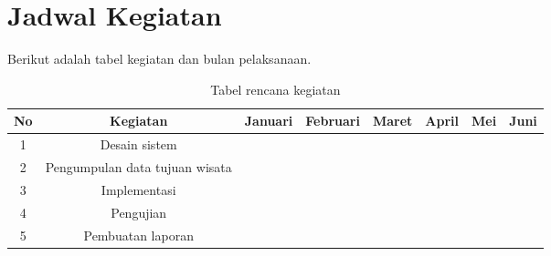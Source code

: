 \section{Jadwal Kegiatan}
Berikut adalah tabel kegiatan dan bulan pelaksanaan.
 
\begin{table}[h!]

\begin{tabular}{||c c c c c c c c||} 
 \hline
 No & Kegiatan & Januari & Februari & Maret & April & Mei & Juni \\ [1ex] 
 \hline\hline
 1 & Desain sistem & \cellcolor{blue!25} & \cellcolor{blue!25} & &&&\\ 
 2 & Pengumpulan data tujuan wisata & & \cellcolor{blue!25} & &&&\\ 
 3 & Implementasi & & \cellcolor{blue!25} & \cellcolor{blue!25} & \cellcolor{blue!25} &&\\
 4 & Pengujian & & & & & \cellcolor{blue!25} &\\
 5 & Pembuatan laporan & & & & & \cellcolor{blue!25} & \cellcolor{blue!25} \\ [1ex]

 \hline
\end{tabular}
\caption{Tabel rencana kegiatan}
\label{table:1}
\end{table}